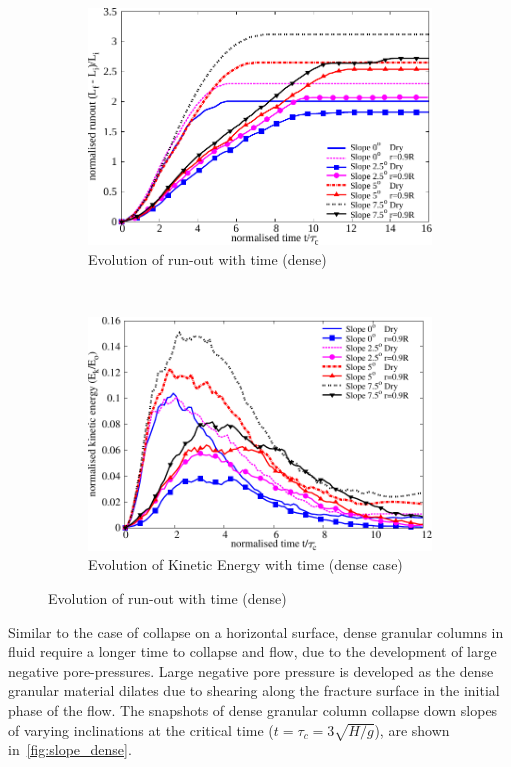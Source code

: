 \begin{figure}
\centering
\begin{subfigure}[t]{0.95\textwidth}
\centering
\includegraphics[width=0.95\columnwidth]{Runout_dense_slope}
\caption{Evolution of run-out with time (dense)}
\label{fig:run_dense}
\end{subfigure}\\
\begin{subfigure}[t]{0.95\textwidth}
\centering
\includegraphics[width=0.95\columnwidth]{KE_dense_slope}
\caption{Evolution of Kinetic Energy with time (dense case)}
\label{fig:KE_dense}
\end{subfigure}
\caption{Evolution of run-out with time (dense)}
\label{fig:run_KE_dense}
\end{figure}

Similar to the case of collapse on a horizontal surface, dense granular columns 
in fluid require a longer time to collapse and flow, due to the development of 
large negative pore-pressures. Large negative pore pressure is developed as the 
dense granular material dilates due to shearing along the fracture surface in 
the initial phase of the flow. The snapshots of dense granular column collapse 
down slopes of varying inclinations at the critical time 
($t=\tau_{c}=3\sqrt{H/g}$), are shown in~\cref{fig:slope_dense}.

